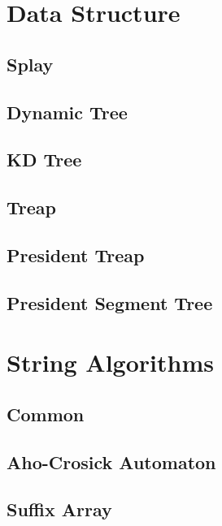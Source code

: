 \documentclass[10pt]{article}
\begin{document}
\tableofcontents
\newpage

\section{Data Structure}
\subsection{Splay}

\subsection{Dynamic Tree}

\subsection{KD Tree}

\subsection{Treap}

\subsection{President Treap}

\subsection{President Segment Tree}

\section{String Algorithms}
\subsection{Common}

\subsection{Aho-Crosick Automaton}

\subsection{Suffix Array}

\end{document}
